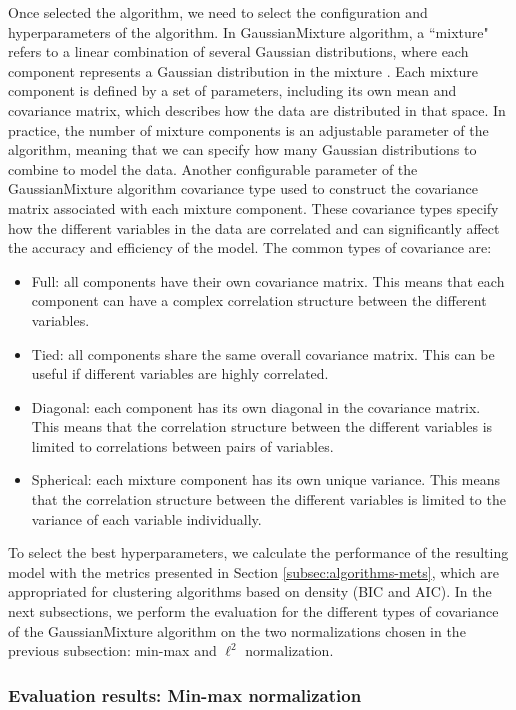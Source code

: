 Once selected the algorithm, we need to select the configuration and hyperparameters of the algorithm. In GaussianMixture algorithm, a ``mixture" refers to a linear combination of several Gaussian distributions, where each component represents a Gaussian distribution in the mixture \cite{Reynolds2009}. Each mixture component is defined by a set of parameters, including its own mean and covariance matrix, which describes how the data are distributed in that space. In practice, the number of mixture components is an adjustable parameter of the algorithm, meaning that we can specify how many Gaussian distributions to combine to model the data. Another configurable parameter of the GaussianMixture algorithm covariance type used to construct the covariance matrix associated with each mixture component. These covariance types specify how the different variables in the data are correlated and can significantly affect the accuracy and efficiency of the model. The common types of covariance are:

\begin{itemize}
    \item Full: all components have their own covariance matrix. This means that each component can have a complex correlation structure between the different variables.
    \item Tied: all components share the same overall covariance matrix. This can be useful if different variables are highly correlated.
    \item Diagonal: each component has its own diagonal in the covariance matrix. This means that the correlation structure between the different variables is limited to correlations between pairs of variables.
    \item Spherical: each mixture component has its own unique variance. This means that the correlation structure between the different variables is limited to the variance of each variable individually.
\end{itemize}

To select the best hyperparameters, we calculate the performance of the resulting model with the metrics presented in Section \ref{subsec:algorithms-mets}, which are appropriated for clustering algorithms based on density (BIC and AIC). In the next subsections, we perform the evaluation for the different types of covariance of the GaussianMixture algorithm on the two normalizations chosen in the previous subsection: min-max and $\ell^2$ normalization.


\subsubsection*{Evaluation results: Min-max normalization}

